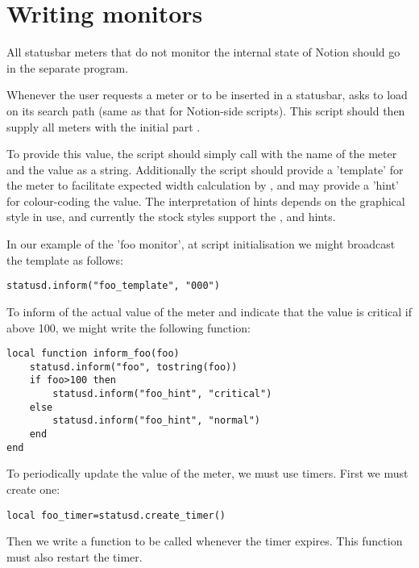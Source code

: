 
\section{Writing  monitors}
\label{sec:statusd}

All statusbar meters that do not monitor the internal state of Notion should
go in the separate  program. 

Whenever the user requests a meter  or  to 
be  inserted in a statusbar,  asks  
to load  on its search path (same as that for Notion-side 
scripts). This script should then supply all meters with the initial part
.

To provide this value, the script should simply call 
with the name of the meter and the value as a string.
Additionally the script should provide a 'template' for the meter to
facilitate expected width calculation by , and
may provide a 'hint' for colour-coding the value. The interpretation
of hints depends on the graphical style in use, and currently the
stock styles support the ,  and 
 hints.


In our example of the 'foo monitor', at script initialisation we might broadcast
the template as follows:

\begin{verbatim}
statusd.inform("foo_template", "000")
\end{verbatim}

To inform  of the actual value of the meter and
indicate that the value is critical if above 100, we might write the
following function:

\begin{verbatim}
local function inform_foo(foo)
    statusd.inform("foo", tostring(foo))
    if foo>100 then
        statusd.inform("foo_hint", "critical")
    else
        statusd.inform("foo_hint", "normal")
    end
end    
\end{verbatim}
    
To periodically update the value of the meter, we must use timers.
First we must create one:

\begin{verbatim}
local foo_timer=statusd.create_timer()
\end{verbatim}

Then we write a function to be called whenever the timer expires.
This function must also restart the timer.

